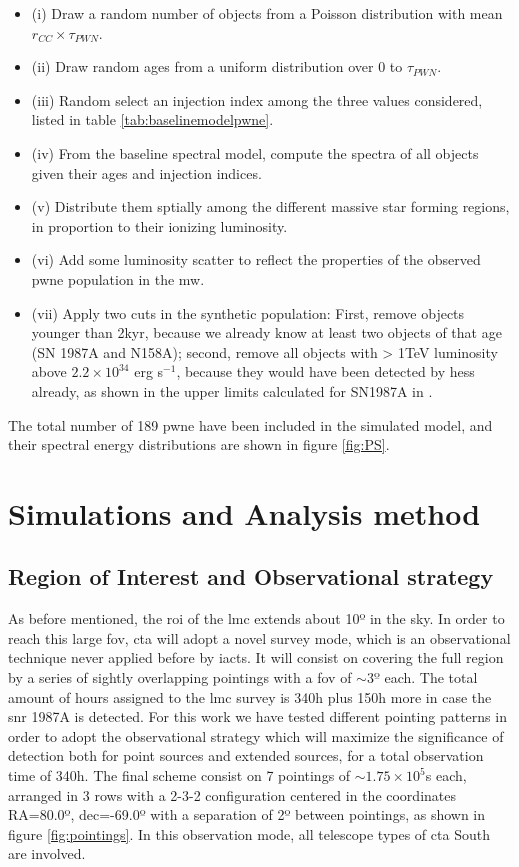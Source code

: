 \documentclass[main.tex]{subfiles}
\begin{document}
\begin{itemize}
\item (i) Draw a random number of objects from a Poisson distribution with mean $r_{CC} \times \tau_{PWN}$.
\item (ii) Draw random ages from a uniform distribution over 0 to $\tau_{PWN}$.
\item(iii) Random select an injection index among the three values considered, listed in table \ref{tab:baselinemodelpwne}.
\item (iv) From the baseline spectral model, compute the spectra of all objects given their ages and injection indices.
\item (v) Distribute them sptially among the different massive star forming regions, in proportion to their ionizing luminosity.
\item(vi) Add some luminosity scatter to reflect the properties of the observed \gls{pwne} population in the \gls{mw}.
  \item(vii) Apply two cuts in the synthetic population: First, remove objects younger than 2kyr, because we already know at least two objects of that age (SN 1987A and N158A); second, remove all objects with > 1TeV luminosity above $2.2 \times 10^{34}$ erg s$^{-1}$, because they would have been detected by \gls{hess} already, as shown in the upper limits calculated for SN1987A in \cite{2012HESSLMC}. 
\end{itemize}

The total number of 189 \gls{pwne} have been included in the simulated model, and their spectral energy distributions are shown in figure \ref{fig:PS}.

\section{Simulations and Analysis method} \label{sec:simana}

\subsection{Region of Interest and Observational strategy}

As before mentioned, the  \gls{roi} of the \gls{lmc} extends about 10º in the sky. In order to reach this large \gls{fov}, \gls{cta} will adopt a novel survey mode, which is an observational technique never applied before by \glspl{iact}. It will consist on covering the full region by a series of sightly overlapping pointings with a \gls{fov} of $\sim 3º$ each. The total amount of hours assigned to the \gls{lmc} survey is 340h plus 150h more in case the \gls{snr} 1987A is detected. For this work we have tested different pointing patterns in order to adopt the observational strategy which will maximize the significance of detection both for point sources and extended sources, for a total observation time of 340h. The final scheme consist on 7 pointings of $\sim 1.75 \times 10^5$s each, arranged in 3 rows with a 2-3-2 configuration centered in the coordinates RA=80.0º, dec=-69.0º with a separation of 2º between pointings, as shown in figure \ref{fig:pointings}. In this observation mode, all telescope types of \gls{cta} South are involved.
\end{document}
